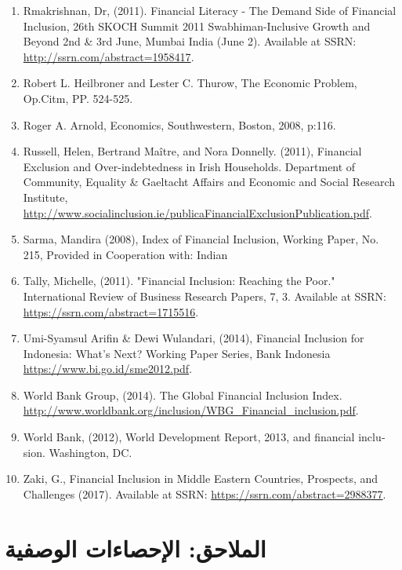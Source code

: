 \documentclass[10pt,a4paper]{report}
\renewcommand{\arraystretch}{1} %
\begin{document}
\begin{english}
\begin{enumerate}
	 \url{https://www.cgap.org/blog/10-useful-data-sources-measuring-financial-inclusion}. (Accessed 13 January 2021)
	\item Rmakrishnan, Dr, (2011). Financial Literacy - The Demand Side of Financial Inclusion, 26th SKOCH Summit 2011 Swabhiman-Inclusive Growth and Beyond 2nd \& 3rd June, Mumbai India (June 2). Available at SSRN: \url{http://ssrn.com/abstract=1958417}.
	\item Robert L. Heilbroner and Lester C. Thurow, The Economic Problem, Op.Citm, PP. 524-525.
	\item Roger A. Arnold, Economics, Southwestern, Boston, 2008, p:116.
	\item Russell, Helen, Bertrand Maître, and Nora Donnelly. (2011), Financial Exclusion and Over-indebtedness in Irish Households. Department of Community, Equality \& Gaeltacht Affairs and Economic and Social Research Institute, \url{http://www.socialinclusion.ie/publicaFinancialExclusionPublication.pdf}.
	\item Sarma, Mandira (2008), Index of Financial Inclusion, Working Paper, No. 215, Provided in Cooperation with: Indian
	\item Tally, Michelle, (2011). "Financial Inclusion: Reaching the Poor." International Review of Business Research Papers, 7, 3. Available at SSRN: \url{https://ssrn.com/abstract=1715516}.
	\item Umi-Syamsul Arifin \& Dewi Wulandari, (2014), Financial Inclusion for Indonesia: What’s Next? Working Paper Series, Bank Indonesia \url{https://www.bi.go.id/sme2012.pdf}.
	\item World Bank Group, (2014). The Global Financial Inclusion Index. \url{http://www.worldbank.org/inclusion/WBG_Financial_inclusion.pdf}.
	\item World Bank, (2012), World Development Report, 2013, and financial inclusion. Washington, DC.
	\item Zaki, G., Financial Inclusion in Middle Eastern Countries, Prospects, and Challenges (2017). Available at SSRN: \url{https://ssrn.com/abstract=2988377}.
\end{enumerate}
		\end{english}
		
\chapter{الملاحق: الإحصاءات الوصفية}
\thispagestyle{empty}
\clearpage
\pagestyle{basicstyle}
	\large
	\renewcommand{\arraystretch}{1.5} %
	
\end{document}
